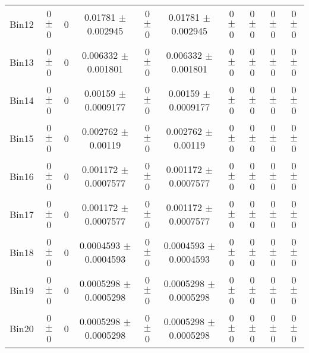 \begin{tabular}{@{\extracolsep{4pt}}lccccccccc@{}}
     Bin12 & 0 $\pm$ 0 & 0 & 0.01781 $\pm$ 0.002945 & 0 $\pm$ 0 & 0.01781 $\pm$ 0.002945 & 0 $\pm$ 0 & 0 $\pm$ 0 & 0 $\pm$ 0 & 0 $\pm$ 0 \\ 
     Bin13 & 0 $\pm$ 0 & 0 & 0.006332 $\pm$ 0.001801 & 0 $\pm$ 0 & 0.006332 $\pm$ 0.001801 & 0 $\pm$ 0 & 0 $\pm$ 0 & 0 $\pm$ 0 & 0 $\pm$ 0 \\ 
     Bin14 & 0 $\pm$ 0 & 0 & 0.00159 $\pm$ 0.0009177 & 0 $\pm$ 0 & 0.00159 $\pm$ 0.0009177 & 0 $\pm$ 0 & 0 $\pm$ 0 & 0 $\pm$ 0 & 0 $\pm$ 0 \\ 
     Bin15 & 0 $\pm$ 0 & 0 & 0.002762 $\pm$ 0.00119 & 0 $\pm$ 0 & 0.002762 $\pm$ 0.00119 & 0 $\pm$ 0 & 0 $\pm$ 0 & 0 $\pm$ 0 & 0 $\pm$ 0 \\ 
     Bin16 & 0 $\pm$ 0 & 0 & 0.001172 $\pm$ 0.0007577 & 0 $\pm$ 0 & 0.001172 $\pm$ 0.0007577 & 0 $\pm$ 0 & 0 $\pm$ 0 & 0 $\pm$ 0 & 0 $\pm$ 0 \\ 
     Bin17 & 0 $\pm$ 0 & 0 & 0.001172 $\pm$ 0.0007577 & 0 $\pm$ 0 & 0.001172 $\pm$ 0.0007577 & 0 $\pm$ 0 & 0 $\pm$ 0 & 0 $\pm$ 0 & 0 $\pm$ 0 \\ 
     Bin18 & 0 $\pm$ 0 & 0 & 0.0004593 $\pm$ 0.0004593 & 0 $\pm$ 0 & 0.0004593 $\pm$ 0.0004593 & 0 $\pm$ 0 & 0 $\pm$ 0 & 0 $\pm$ 0 & 0 $\pm$ 0 \\ 
     Bin19 & 0 $\pm$ 0 & 0 & 0.0005298 $\pm$ 0.0005298 & 0 $\pm$ 0 & 0.0005298 $\pm$ 0.0005298 & 0 $\pm$ 0 & 0 $\pm$ 0 & 0 $\pm$ 0 & 0 $\pm$ 0 \\ 
     Bin20 & 0 $\pm$ 0 & 0 & 0.0005298 $\pm$ 0.0005298 & 0 $\pm$ 0 & 0.0005298 $\pm$ 0.0005298 & 0 $\pm$ 0 & 0 $\pm$ 0 & 0 $\pm$ 0 & 0 $\pm$ 0 \\ 
\hline\hline
  \end{tabular}
